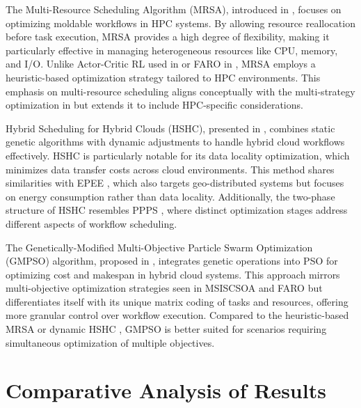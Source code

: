 \documentclass[a4paper, final]{article}
\begin{document}
The Multi-Resource Scheduling Algorithm (MRSA), introduced in \cite{bib:8}, focuses on optimizing moldable 
workflows in HPC systems. By allowing resource reallocation before task execution, MRSA provides a high degree 
of flexibility, making it particularly effective in managing heterogeneous resources like CPU, memory, 
and I/O. Unlike Actor-Critic RL used in \cite{bib:1_acrl} or FARO in \cite{bib:2_faro}, MRSA employs a 
heuristic-based optimization strategy tailored to HPC environments. This emphasis on multi-resource 
scheduling aligns conceptually with the multi-strategy optimization in \cite{bib:3_sandcat} but extends it 
to include HPC-specific considerations.

Hybrid Scheduling for Hybrid Clouds (HSHC), presented in \cite{bib:9}, combines static genetic algorithms 
with dynamic adjustments to handle hybrid cloud workflows effectively. HSHC is particularly notable for its 
data locality optimization, which minimizes data transfer costs across cloud environments. This method 
shares similarities with EPEE \cite{bib:5_epee}, which also targets geo-distributed systems but focuses 
on energy consumption rather than data locality. Additionally, the two-phase structure of HSHC resembles 
PPPS \cite{bib:7_ppps}, where distinct optimization stages address different aspects of workflow scheduling.

The Genetically-Modified Multi-Objective Particle Swarm Optimization (GMPSO) algorithm, proposed in 
\cite{bib:10}, integrates genetic operations into PSO for optimizing cost and makespan in hybrid cloud 
systems. This approach mirrors multi-objective optimization strategies seen in MSISCSOA \cite{bib:3_sandcat} 
and FARO \cite{bib:2_faro} but differentiates itself with its unique matrix coding of tasks and resources, 
offering more granular control over workflow execution. Compared to the heuristic-based MRSA \cite{bib:8} 
or dynamic HSHC \cite{bib:9}, GMPSO is better suited for scenarios requiring simultaneous optimization of 
multiple objectives.



\section{Comparative Analysis of Results}
\end{document}
